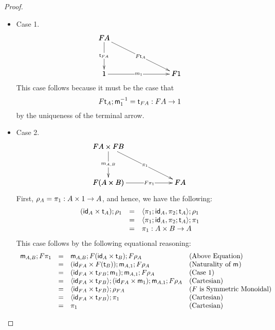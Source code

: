 \begin{proof}
  \ \\
  \begin{itemize}
  \item[] Case 1.\\
    \[
      \bfig
      \btriangle|mmm|<1000,500>[
        FA`
        1`
        F1;
        \t_{FA}`
        F\t_{A}`
        m_1]
      \efig
    \]
    This case follows because it must be the case that
    \[F\t_{A};\m{1}^{-1} = \t_{FA} : FA \mto 1\]
    by the uniqueness of the terminal arrow.
    
  \item[] Case 2.\\
    \[
      \bfig
      \btriangle|mmm|<1000,500>[
        FA \times FB`
        F(A \times B)`
        FA;
        m_{A,B}`
        \pi_1`
        F\pi_1]
      \efig
      \]
      First, $\rho_A = \pi_1 : A \times 1 \mto A$, and hence, we have the following:
      \[
      \begin{array}{lll}
        (\id_A \times \t_A);\rho_1 & = & \langle \pi_1;\id_A, \pi_2;\t_A \rangle;\rho_1\\
        & = & \langle \pi_1;\id_A, \pi_2;\t_A \rangle;\pi_1\\
        & = & \pi_1 : A \times B \mto A
      \end{array}
      \]
      This case follows by the following equational reasoning:
      \[
      \begin{array}{llllllll}
        \mathsf{m}_{A,B};F\pi_1
        & = & \mathsf{m}_{A,B};F(\mathsf{id}_A \times \mathsf{t}_B);F\rho_A & \text{(Above Equation)}\\
        & = & (\mathsf{id}_{FA} \times F(\mathsf{t}_{B}));\mathsf{m}_{A,1};F\rho_A & \text{(Naturality of $\mathsf{m}_{}$)}\\
        & = & (\mathsf{id}_{FA} \times \mathsf{t}_{FB};\mathsf{m}_{1});\mathsf{m}_{A,1};F\rho_A & \text{(Case 1)}\\
        & = & \langle \mathsf{id}_{FA} \times \mathsf{t}_{FB} \rangle;(\mathsf{id}_{FA} \times \mathsf{m}_{1});\mathsf{m}_{A,1};F\rho_A & \text{(Cartesian)}\\
        & = & \langle \mathsf{id}_{FA} \times \mathsf{t}_{FB} \rangle;\rho_{FA} & \text{($F$ is Symmetric Monoidal)}\\
        & = & \langle \mathsf{id}_{FA} \times \mathsf{t}_{FB} \rangle;\pi_1 & \text{(Cartesian)}\\
        & = & \pi_1 & \text{(Cartesian)}\\ 
      \end{array}
      \]
    

\end{itemize}
\end{proof}
